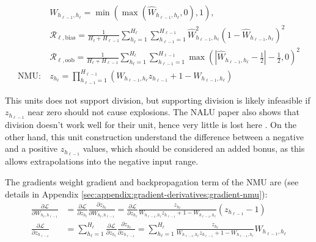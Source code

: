 \begin{equation}
\begin{aligned}
&W_{h_{\ell-1},h_\ell} = \min(\max(\hat{W}_{h_{\ell-1},h_\ell}, 0), 1), \\
&\mathcal{R}_{\ell,\mathrm{bias}} = \frac{1}{H_\ell + H_{\ell-1}} \sum_{h_\ell=1}^{H_\ell} \sum_{h_{\ell-1}=1}^{H_{\ell-1}} \hat{W}_{h_{\ell-1},h_\ell}^2 (1 - \hat{W}_{h_{\ell-1},h_\ell})^2 \\
&\mathcal{R}_{\ell,\mathrm{oob}} = \frac{1}{H_\ell + H_{\ell-1}} \sum_{h_\ell=1}^{H_\ell} \sum_{h_{\ell-1}=1}^{H_{\ell-1}} \max\left(\left|\hat{W}_{h_{\ell-1},h_\ell} - \frac{1}{2}\right| - \frac{1}{2}, 0\right)^2 \\
\textrm{NMU}:\ &z_{h_\ell} = \prod_{h_{\ell-1}=1}^{H_{\ell-1}} \left(W_{h_{\ell-1},h_\ell} z_{h_{\ell-1}} + 1 - W_{h_{\ell-1},h_\ell} \right)
\end{aligned}
\end{equation}

This units does not support division, but supporting division is likely infeasible if $z_{h_{\ell-1}}$ near zero should not cause explosions. The NALU paper also shows that division doesn't work well for their unit, hence very little is lost here \cite{trask-nalu}. On the other hand, this unit construction understand the difference between a negative and a positive $z_{h_{\ell-1}}$ values, which should be considered an added bonus, as this allows extrapolations into the negative input range.

The gradients weight gradient and backpropagation term of the NMU are (see details in Appendix \ref{sec:appendix:gradient-derivatives:gradient-nmu}):
\begin{equation}
\begin{aligned}
\frac{\partial \mathcal{L}}{\partial W_{h_{\ell}, h_{\ell - 1}}} &= \frac{\partial \mathcal{L}}{\partial z_{h_\ell}} \frac{\partial z_{h_\ell}}{\partial W_{h_{\ell}, h_{\ell - 1}}} = \frac{\partial \mathcal{L}}{\partial z_{h_\ell}} \frac{z_{h_\ell}}{W_{h_{\ell-1},h_\ell} z_{h_{\ell-1}} + 1 - W_{h_{\ell-1},h_\ell}} \left(z_{h_{\ell-1}} - 1\right) \\
\frac{\partial \mathcal{L}}{\partial z_{h_{\ell-1}}} &= \sum_{h_\ell = 1}^{H_\ell} \frac{\partial \mathcal{L}}{\partial z_{h_\ell}} \frac{\partial z_{h_\ell}}{\partial z_{h_{\ell-1}}} = \sum_{h_\ell = 1}^{H_\ell} \frac{z_{h_\ell}}{W_{h_{\ell-1},h_\ell} z_{h_{\ell-1}} + 1 - W_{h_{\ell-1},h_\ell}} W_{h_{\ell-1},h_\ell}
\end{aligned}
\end{equation}

